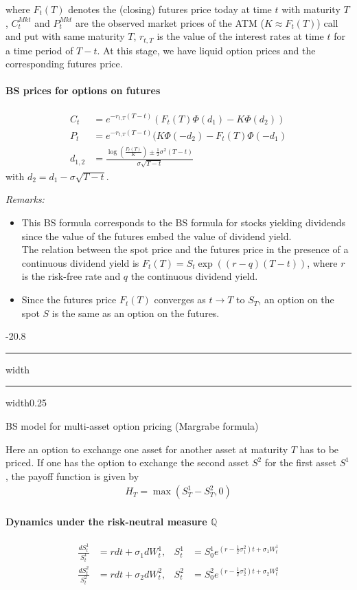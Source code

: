 \documentclass[a4paper,landscape,7pt,fleqn]{scrartcl}
\makeatletter
\renewcommand{\subsection}{\@startsection{subsection}{1}{0mm}%
{-2\baselineskip}{0.8\baselineskip}%
{\hrule depth 0.2pt width\columnwidth\hrule depth0.75pt
width0.25\columnwidth\vspace*{1.2em}\large\bfseries}}
\makeatother
\begin{document}
\begin{multicols*}{3}
where $F_t(T)$ denotes the (closing) futures price today at time $t$ with maturity $T$, $C_t^{Mkt}$ and $P_t^{Mkt}$ are the observed market prices of the ATM ($K \approx F_t(T)$) call and put with same maturity $T$, $r_{t,T}$ is the value of the interest rates at time $t$ for a time period of $T-t$. At this stage, we have liquid option prices and the corresponding futures price.

\paragraph{BS prices for options on futures}
\begin{align*}
C_t &= e^{-r_{t,T} (T-t)} (F_t(T) \Phi (d_1) - K \Phi (d_2)) \\
P_t &= e^{-r_{t,T} (T-t)} (K \Phi (-d_2) - F_t(T) \Phi (-d_1) \\
d_{1,2} &= \frac{\log \left( \frac{F_t(T)}{K} \right) \pm \frac{1}{2} \sigma^2 (T-t)}{\sigma \sqrt{T-t}}
\end{align*}
with $d_2 = d_1 - \sigma \sqrt{T-t}$.

\textit{Remarks:}
\begin{itemize}
\item This BS formula corresponds to the BS formula for stocks yielding dividends since the value of the futures embed the value of dividend yield. \\
The relation between the spot price and the futures price in the presence of a continuous dividend yield is $F_t(T) = S_t \exp ((r-q)(T-t))$, where $r$ is the risk-free rate and $q$ the continuous dividend yield.
\item Since the futures price $F_t(T)$ converges as $t \rightarrow T$ to $S_T$, an option on the spot $S$ is the same as an option on the futures.
\end{itemize}

\subsection{BS model for multi-asset option pricing (Margrabe formula)}

Here an option to exchange one asset for another asset at maturity $T$ has to be priced. If one has the option to exchange the second asset $S^2$ for the first asset $S^1$, the payoff function is given by
\begin{align*}
H_T = \max(S_T^1 - S_T^2,0)
\end{align*}

\paragraph{Dynamics under the risk-neutral measure $\mathbb{Q}$}
\begin{align*}
\frac{dS_t^1}{S_t^1} &= r dt + \sigma_1 dW_t^1, & S_t^1 &= S_0^1 e^{\left( r - \frac{1}{2} \sigma_1^2 \right) t + \sigma_1 W_t^1} \\
\frac{dS_t^2}{S_t^2} &= r dt + \sigma_2 dW_t^2, & S_t^2 &= S_0^2 e^{\left( r - \frac{1}{2} \sigma_2^2 \right) t + \sigma_2 W_t^2}
\end{align*}


\end{multicols*}
\end{document}
